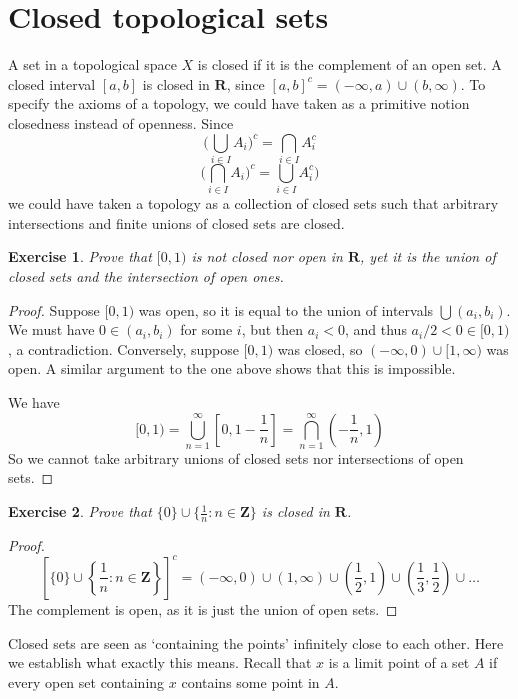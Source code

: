 \documentclass{report}
\theoremstyle{plain}
\newtheorem{exercise}{Exercise}[section]
\theoremstyle{definition}
\begin{document}
\section{Closed topological sets}

A set in a topological space $X$ is closed if it is the complement of an open set. A closed interval $[a,b]$ is closed in $\mathbf{R}$, since $[a,b]^c = (-\infty, a) \cup (b,\infty)$. To specify the axioms of a topology, we could have taken as a primitive notion closedness instead of openness. Since
%
\[ \big( \bigcup_{i \in I} A_i \big)^c = \bigcap_{i \in I} A_i^c \]
%
\[ \big( \bigcap_{i \in I} A_i \big)^c = \bigcup_{i \in I} A_i^c \big) \]
%
we could have taken a topology as a collection of closed sets such that arbitrary intersections and finite unions of closed sets are closed.

\begin{exercise}
    Prove that $[0,1)$ is not closed nor open in $\mathbf{R}$, yet it is the union of closed sets and the intersection of open ones.
\end{exercise}
\begin{proof}
    Suppose $[0,1)$ was open, so it is equal to the union of intervals $\bigcup (a_i,b_i)$. We must have $0 \in (a_i, b_i)$ for some $i$, but then $a_i < 0$, and thus $a_i/2 < 0 \in [0,1)$, a contradiction. Conversely, suppose $[0,1)$ was closed, so $(-\infty, 0) \cup [1,\infty)$ was open. A similar argument to the one above shows that this is impossible.

    We have
    \[ [0,1) = \bigcup_{n = 1}^\infty \left[0, 1 - \frac{1}{n} \right] = \bigcap_{n = 1}^\infty (-\frac{1}{n}, 1) \]
    So we cannot take arbitrary unions of closed sets nor intersections of open sets.
\end{proof}

\begin{exercise}
    Prove that $\{0\} \cup \{ \frac{1}{n} : n \in \mathbf{Z} \}$ is closed in $\mathbf{R}$.
\end{exercise}
\begin{proof}
    \[ \left[\{0\} \cup \left\{ \frac{1}{n} : n \in \mathbf{Z} \right\}\right]^c = (-\infty, 0) \cup (1, \infty) \cup \left(\frac{1}{2},1\right) \cup \left(\frac{1}{3},\frac{1}{2}\right) \cup \dots \]
    The complement is open, as it is just the union of open sets.
\end{proof}

Closed sets are seen as `containing the points' infinitely close to each other. Here we establish what exactly this means. Recall that $x$ is a limit point of a set $A$ if every open set containing $x$ contains some point in $A$.
\end{document}
